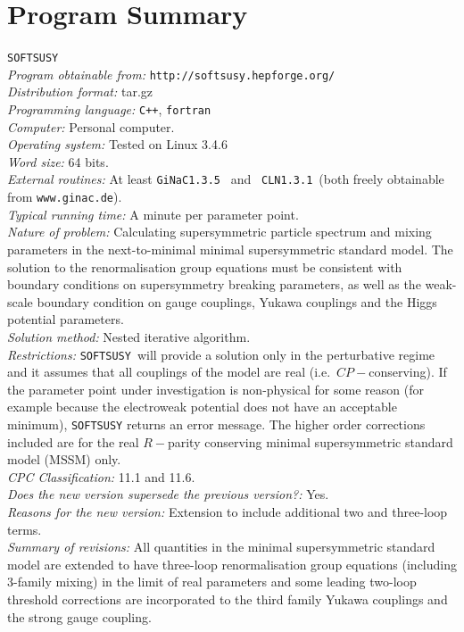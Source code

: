 \documentclass[final,3p,times,pdflatex]{elsarticle}
\def\SOFTSUSY{{\tt SOFTSUSY}}
\begin{document}
\section{Program Summary}
 \SOFTSUSY{}\\
{\em Program obtainable   from:} {\tt http://softsusy.hepforge.org/}\\
{\em Distribution format:}\/ tar.gz\\
{\em Programming language:} {\tt C++}, {\tt fortran}\\
{\em Computer:}\/ Personal computer.\\
{\em Operating system:}\/ Tested on Linux 3.4.6\\
{\em Word size:}\/ 64 bits.\\
{\em External routines:}\/ At least {\tt GiNaC1.3.5}~\cite{ginac} and {\tt
  CLN1.3.1}~(both freely obtainable from \verb|www.ginac.de|).\\
{\em Typical running time:}\/ A minute per parameter point.\\
{\em Nature of problem:}\/ Calculating supersymmetric particle spectrum and
mixing parameters in the next-to-minimal minimal supersymmetric standard
model. The solution to the renormalisation group equations must be consistent
with boundary conditions on supersymmetry breaking parameters, as
well as the weak-scale boundary condition on gauge 
couplings, Yukawa couplings and the Higgs potential parameters.\\
{\em Solution method:}\/ Nested iterative algorithm. \\
{\em Restrictions:} \SOFTSUSY~will provide a solution only in the
perturbative regime and it
assumes that all couplings of the model are real
(i.e.\ $CP-$conserving). If the parameter point under investigation is
non-physical for some reason (for example because the electroweak potential
does not have an acceptable minimum), \SOFTSUSY{} returns an error message.
The higher order corrections included are for the real $R-$parity conserving
minimal supersymmetric standard model (MSSM) only.\\
{\em CPC Classification:} 11.1 and 11.6.\\
{\em Does the new version supersede the previous version?:} Yes.\\
{\em Reasons for the new version:} Extension to include additional two
and three-loop terms.\\
{\em Summary of revisions:} 
All quantities in the minimal supersymmetric standard model are extended to
have three-loop renormalisation group equations (including 3-family mixing) in
the limit of real 
parameters and some leading two-loop threshold
corrections are incorporated to the third family Yukawa couplings and the
strong gauge coupling. 
\newpage
\end{document}
